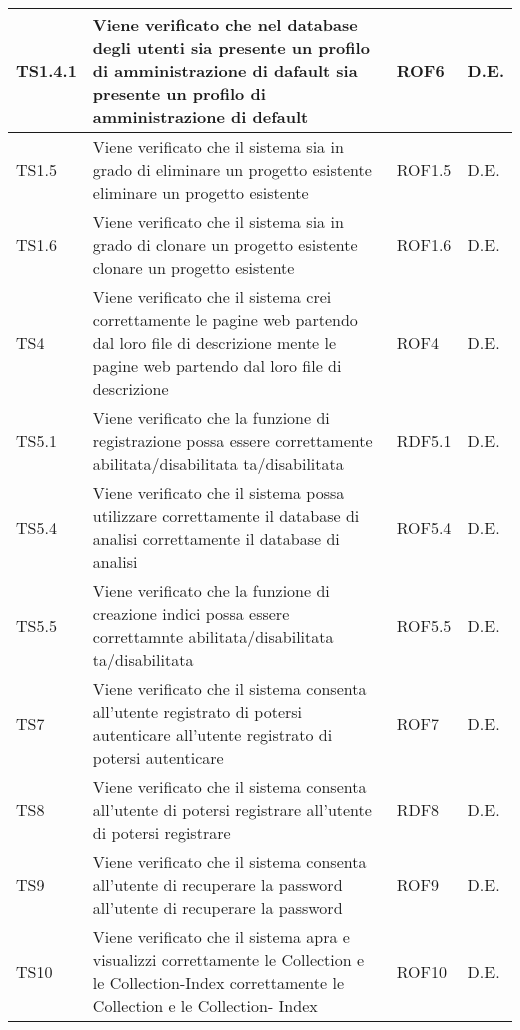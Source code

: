 \begin{center}
\begin{longtable}{|p{2cm}|p{7cm}|p{2cm}|p{2cm}|}
\midrule
TS1.4.1
& Viene verificato che nel database degli utenti sia presente un profilo di amministrazione di dafault
sia presente un profilo di amministrazione di
default
& ROF6
& D.E.\\


\midrule
TS1.5
& Viene verificato che il sistema sia in grado di eliminare un progetto esistente
eliminare un progetto esistente
& ROF1.5
& D.E.\\


\midrule
TS1.6
& Viene verificato che il sistema sia in grado di clonare un progetto esistente
clonare un progetto esistente
& ROF1.6
& D.E.\\


\midrule
TS4
& Viene verificato che il sistema crei correttamente le pagine web partendo dal loro file di descrizione
mente le pagine web partendo dal loro file
di descrizione
& ROF4
& D.E.\\


\midrule
TS5.1
& Viene verificato che la funzione di registrazione possa essere correttamente abilitata/disabilitata
ta/disabilitata
& RDF5.1
& D.E.\\


\midrule
TS5.4
& Viene verificato che il sistema possa utilizzare correttamente il database di analisi
correttamente il database di analisi
& ROF5.4
& D.E.\\


\midrule
TS5.5
& Viene verificato che la funzione di creazione indici possa essere correttamnte abilitata/disabilitata
ta/disabilitata
& ROF5.5
& D.E.\\


\midrule
TS7
& Viene verificato che il sistema consenta all'utente registrato di potersi autenticare
all'utente registrato di potersi autenticare
& ROF7
& D.E.\\


\midrule
TS8
& Viene verificato che il sistema consenta all'utente di potersi registrare
all'utente di potersi registrare
& RDF8
& D.E.\\


\midrule
TS9
& Viene verificato che il sistema consenta all'utente di recuperare la password
all'utente di recuperare la password
& ROF9
& D.E.\\


\midrule
TS10
& Viene verificato che il sistema apra e visualizzi correttamente le Collection e le Collection-Index
correttamente le Collection e le Collection-
Index
& ROF10
& D.E.\\



\end{longtable}
\end{center}
